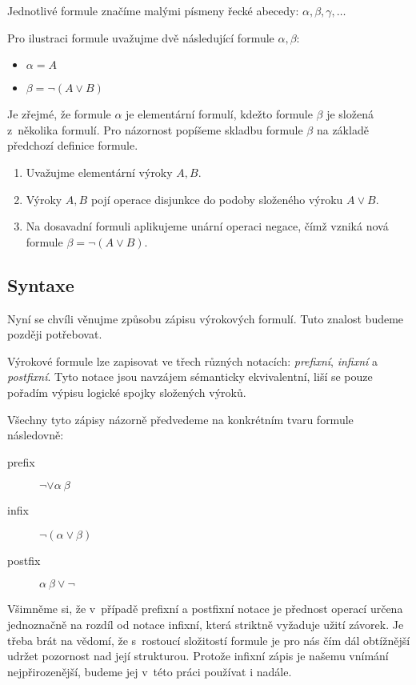 \documentclass[thesis=B,czech,hidelinks]{FITthesis}[2012/06/26]
\begin{document}
Jednotlivé formule značíme malými písmeny řecké abecedy: $\alpha , \beta , \gamma , \ldots$

\begin{ex}
	Pro ilustraci formule uvažujme dvě následující formule $\alpha, \beta$:
	\begin{itemize}
		\item $\alpha = A$
		\item $\beta = \neg (A \vee B)$
	\end{itemize}
	Je zřejmé, že formule $\alpha$ je elementární formulí, kdežto formule $\beta$ je složená z~několika formulí. Pro názornost popíšeme skladbu formule $\beta$ na základě předchozí definice formule.
	\begin{enumerate}
		\item Uvažujme elementární výroky $A, B$.
		\item Výroky $A, B$ pojí operace disjunkce do podoby složeného výroku $A \vee B$.
		\item Na dosavadní formuli aplikujeme unární operaci negace, čímž vzniká nová formule $\beta = \neg (A\vee B)$.
	\end{enumerate}
\end{ex}

\subsection{Syntaxe}

Nyní se chvíli věnujme způsobu zápisu výrokových formulí. Tuto znalost budeme později potřebovat.

Výrokové formule lze zapisovat ve třech různých notacích: \emph{prefixní}, \emph{infixní} a \emph{postfixní}. Tyto notace jsou navzájem sémanticky ekvivalentní, liší se pouze pořadím výpisu logické spojky složených výroků.

\begin{ex}
Všechny tyto zápisy názorně předvedeme na konkrétním tvaru formule následovně:
\begin{description}
	\item[prefix] $\neg \vee \alpha \: \beta$
	\item[infix] $\neg (\alpha \vee \beta)$
	\item[postfix] $\alpha \: \beta \vee \neg$
\end{description}
\end{ex}

Všimněme si, že v~případě prefixní a postfixní notace je přednost operací určena jednoznačně na rozdíl od notace infixní, která striktně vyžaduje užití závorek. Je třeba brát na vědomí, že s~rostoucí složitostí formule je pro nás čím dál obtížnější udržet pozornost nad její strukturou. Protože infixní zápis je našemu vnímání nejpřirozenější, budeme jej v~této práci používat i nadále.
\end{document}
